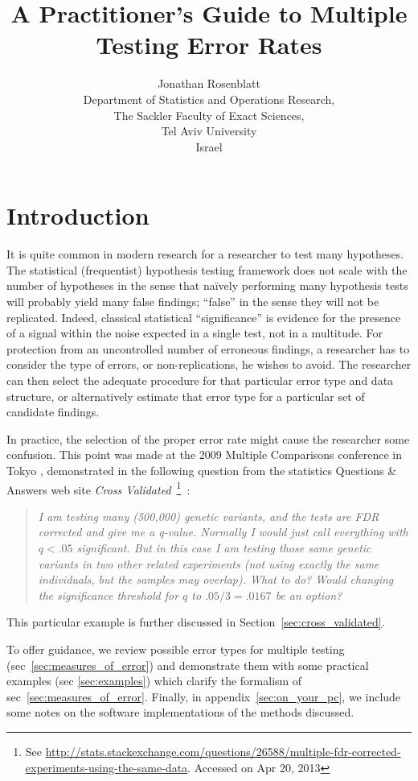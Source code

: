 \documentclass[review,12pt]{article}
\title{A Practitioner's Guide to Multiple Testing Error Rates}
\author{Jonathan Rosenblatt \\
	Department of Statistics and Operations Research,\\
	The Sackler Faculty of Exact Sciences, \\
	Tel Aviv University \\ 
	Israel}
\theoremstyle{definition}
\theoremstyle{definition}
\begin{document}
\maketitle


\section{\label{sec:introduction}Introduction}

It is quite common in modern research for a researcher to test many hypotheses. 
The statistical (frequentist) hypothesis testing framework does not scale with the number of hypotheses in the sense that na\"{i}vely performing many hypothesis tests will probably yield many false findings;  ``false'' in the sense they will not be replicated.
Indeed, classical statistical ``significance'' is evidence for the presence of a signal within the noise expected in a single test, not in a multitude. 
For protection from an uncontrolled number of erroneous findings, a researcher has to consider the type of errors, or non-replications, he wishes to avoid. The researcher can then select the adequate procedure for that particular error type and data structure, or alternatively estimate that error type for a particular set of candidate findings. 

In practice, the selection of the proper error rate might cause the researcher some confusion. This point was made at the 2009 Multiple Comparisons conference in Tokyo \citep[][Section 4.4]{benjamini_simultaneous_2010}, demonstrated in the following question from the statistics Questions \& Answers web site \emph{Cross Validated}~\footnote{ See \url{http://stats.stackexchange.com/questions/26588/multiple-fdr-corrected-experiments-using-the-same-data}. Accessed on Apr 20, 2013}~:
\begin{quotation}\em
I am testing many (500,000) genetic variants, and the tests are FDR corrected and give me a q-value. Normally I would just call everything with $q < .05$ significant. But in this case I am testing those same genetic variants in two other related experiments (not using exactly the same individuals, but the samples may overlap). What to do? Would changing the significance threshold for $q$ to $.05/3=.0167$ be an option?
\end{quotation}
This particular example is further discussed in Section~\ref{sec:cross_validated}. 

To offer guidance, we review possible error types for multiple testing (sec~\ref{sec:measures_of_error}) and demonstrate them with some practical examples (sec \ref{sec:examples}) which clarify the formalism of sec~\ref{sec:measures_of_error}. Finally, in appendix~\ref{sec:on_your_pc}, we include some notes on the software implementations of the methods discussed.
\end{document}
